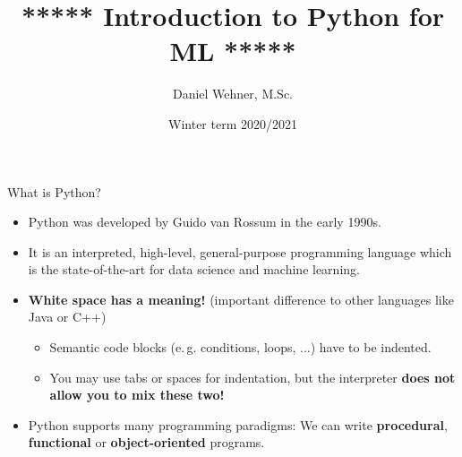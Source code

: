 




\title[Introduction to Python for ML]{***** Introduction to Python for ML *****}
\author{Daniel Wehner, M.Sc.}
\date{Winter term 2020/2021}




\dwPrintTitle

\dwPrintToc


\begin{dwHeaderFrame}{What is Python?}
	\begin{itemize}
		\item Python was developed by Guido van Rossum in the early 1990s.
		\item It is an interpreted, high-level, general-purpose programming language which is the state-of-the-art for data science and machine learning.
		\item \textbf{White space has a meaning!} (important difference to other languages like Java or C++)
		\begin{itemize}
			\item Semantic code blocks (e.\,g. conditions, loops, ...) have to be indented.
			\item You may use tabs or spaces for indentation, but the interpreter \textbf{does not allow you to mix these two!}
		\end{itemize}
		\item Python supports many programming paradigms: We can write \textbf{procedural}, \textbf{functional} or \textbf{object-oriented} programs.
	\end{itemize}
\end{dwHeaderFrame}


